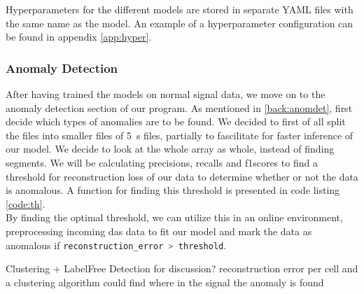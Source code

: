 Hyperparameters for the different models are stored in separate YAML files with the same name as the model. An example of a hyperparameter configuration can be found in appendix \ref{app:hyper}.


\subsubsection{Anomaly Detection}

After having trained the models on normal signal data, we move on to the anomaly detection section of our program. As mentioned in \ref{back:anomdet}, first decide which types of anomalies are to be found. We decided to first of all split the files into smaller files of \qty{5}{\si{\second}} files, partially to fascilitate for faster inference of our model. We decide to look at the whole array as whole, instead of finding segments. We will be calculating precisions, recalls and f1scores to find a threshold for reconstruction loss of our data to determine whether or not the data is anomalous. A function for finding this threshold is presented in code listing \ref{code:th}.  \\



By finding the optimal threshold, we can utilize this in an online environment, preprocessing incoming \acrshort{das} data to fit our model and mark the data as anomalous if \lstinline[language=Julia]{reconstruction_error > threshold}. 

Clustering + LabelFree Detection for discussion? reconstruction error per cell and a clustering algorithm could find where in the signal the anomaly is found

